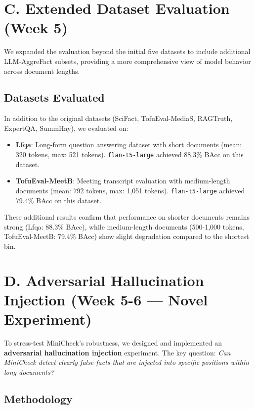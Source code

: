 \documentclass[12pt, letterpaper]{article}
\begin{document}
\section*{C. Extended Dataset Evaluation (Week 5)}

We expanded the evaluation beyond the initial five datasets to include additional LLM-AggreFact subsets, providing a more comprehensive view of model behavior across document lengths.

\subsection*{Datasets Evaluated}

In addition to the original datasets (SciFact, TofuEval-MediaS, RAGTruth, ExpertQA, SummHay), we evaluated on:
\begin{itemize}
    \item \textbf{Lfqa}: Long-form question answering dataset with short documents (mean: 320 tokens, max: 521 tokens). \texttt{flan-t5-large} achieved 88.3\% BAcc on this dataset.
    \item \textbf{TofuEval-MeetB}: Meeting transcript evaluation with medium-length documents (mean: 792 tokens, max: 1,051 tokens). \texttt{flan-t5-large} achieved 79.4\% BAcc on this dataset.
\end{itemize}

These additional results confirm that performance on shorter documents remains strong (Lfqa: 88.3\% BAcc), while medium-length documents (500-1,000 tokens, TofuEval-MeetB: 79.4\% BAcc) show slight degradation compared to the shortest bin.

\section*{D. Adversarial Hallucination Injection (Week 5-6 — Novel Experiment)}

To stress-test MiniCheck's robustness, we designed and implemented an \textbf{adversarial hallucination injection} experiment. The key question: \textit{Can MiniCheck detect clearly false facts that are injected into specific positions within long documents?}

\subsection*{Methodology}
\end{document}
